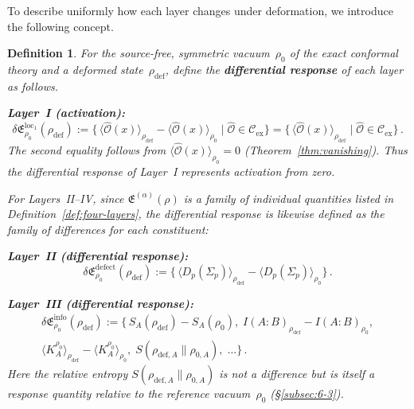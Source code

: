\documentclass[
  aps,
  prd,
  preprint,
  groupedaddress,
  nofootinbib,
  longbibliography
]{revtex4-2}
\newtheorem{definition}{Definition}[section]
\theoremstyle{remark}
\newcommand{\Cex}{\mathcal{C}_{\mathrm{ex}}}
\begin{document}
To describe uniformly how each layer changes under deformation,
we introduce the following concept.

\begin{definition}\label{def:differential-response}
For the source-free, symmetric vacuum~$\rho_0$ of the exact
conformal theory and a deformed state~$\rho_{\mathrm{def}}$,
define the \textbf{differential response} of each layer as
follows.

\textbf{Layer~I (activation):}
\begin{equation}\label{eq:delta-I}
  \delta\mathfrak{E}_{\rho_0}^{\mathrm{loc}_1}%
    (\rho_{\mathrm{def}})
  := \bigl\{\,
    \langle\hat{\mathcal{O}}(x)\rangle_{\rho_{\mathrm{def}}}
    -\langle\hat{\mathcal{O}}(x)\rangle_{\rho_0}
    \;\big|\;
    \hat{\mathcal{O}}\in\Cex
  \bigr\}
  = \bigl\{\,
    \langle\hat{\mathcal{O}}(x)\rangle_{\rho_{\mathrm{def}}}
    \;\big|\;
    \hat{\mathcal{O}}\in\Cex
  \bigr\}\,.
\end{equation}
The second equality follows from
$\langle\hat{\mathcal{O}}(x)\rangle_{\rho_0}=0$
(Theorem~\ref{thm:vanishing}).
Thus the differential response of Layer~I represents activation
from zero.

For Layers~II--IV, since
$\mathfrak{E}^{(\alpha)}(\rho)$ is a family of individual
quantities listed in Definition~\ref{def:four-layers}, the
differential response is likewise defined as the family of
differences for each constituent:

\textbf{Layer~II (differential response):}
\begin{equation}\label{eq:delta-II}
  \delta\mathfrak{E}_{\rho_0}^{\mathrm{defect}}%
    (\rho_{\mathrm{def}})
  := \bigl\{\,
    \langle D_p(\Sigma_p)\rangle_{\rho_{\mathrm{def}}}
    -\langle D_p(\Sigma_p)\rangle_{\rho_0}
  \bigr\}\,.
\end{equation}

\textbf{Layer~III (differential response):}
\begin{multline}\label{eq:delta-III}
  \delta\mathfrak{E}_{\rho_0}^{\mathrm{info}}%
    (\rho_{\mathrm{def}})
  := \bigl\{\,
    S_A(\rho_{\mathrm{def}})-S_A(\rho_0),\;
    I(A{:}B)_{\rho_{\mathrm{def}}}-I(A{:}B)_{\rho_0},\\
    \langle K_A^{\rho_0}\rangle_{\rho_{\mathrm{def}}}
    -\langle K_A^{\rho_0}\rangle_{\rho_0},\;
    S(\rho_{\mathrm{def},A}\|\rho_{0,A}),\;\ldots
  \bigr\}\,.
\end{multline}
Here the relative entropy
$S(\rho_{\mathrm{def},A}\|\rho_{0,A})$ is not a difference
but is itself a response quantity relative to the reference
vacuum~$\rho_0$ (\S\ref{subsec:6-3}).


\end{definition}
\end{document}
